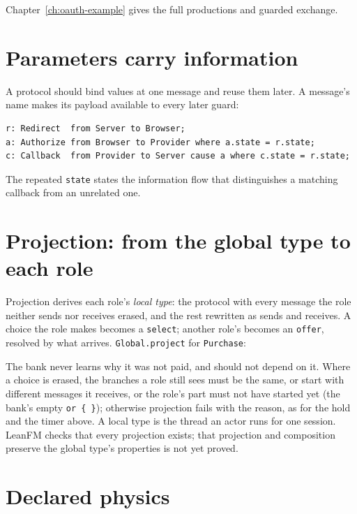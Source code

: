 Chapter~\ref{ch:oauth-example} gives the full productions and guarded exchange.

\section{Parameters carry information}

A protocol should bind values at one message and reuse them later. A message's
name makes its payload available to every later guard:

\begin{lstlisting}[language={}]
r: Redirect  from Server to Browser;
a: Authorize from Browser to Provider where a.state = r.state;
c: Callback  from Provider to Server cause a where c.state = r.state;
\end{lstlisting}

The repeated \texttt{state} states the information flow that distinguishes a
matching callback from an unrelated one.

\section{Projection: from the global type to each role}

Projection derives each role's \emph{local type}: the protocol with every message
the role neither sends nor receives erased, and the rest rewritten as sends and
receives. A choice the role makes becomes a \texttt{select}; another role's becomes
an \texttt{offer}, resolved by what arrives. \texttt{Global.project} for
\texttt{Purchase}:



The bank never learns why it was not paid, and should not depend on it. Where a
choice is erased, the branches a role still sees must be the same, or start with
different messages it receives, or the role's part must not have started yet (the
bank's empty \texttt{or \{ \}}); otherwise projection fails with the reason, as
for the hold and the timer above. A local type is the thread an actor runs for one
session. LeanFM checks that every projection exists; that projection and
composition preserve the global type's properties is not yet proved.

\section{Declared physics}

